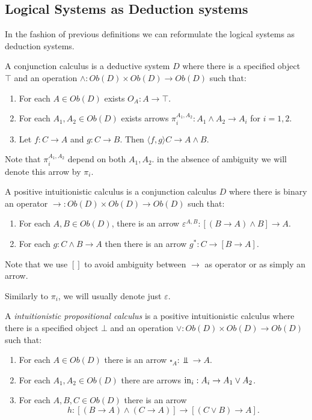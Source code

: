 \subsection{Logical Systems as Deduction systems}
In  the fashion of previous definitions we can reformulate the logical systems as deduction systems.
\begin{definition}
  A conjunction calculus is a deductive system $D$ where there is a specified object $\top$ and an operation $\land: Ob(D)\times Ob(D) \to Ob(D)$ such that:
  \begin{enumerate}
  \item For each $A\in Ob(D)$ exists $O_A:A\to \top$.
  \item For each $A_1,A_2\in Ob(D)$ exists arrows $\pi_i^{A_1,A_2}: A_1 \land A_2 \to A_i$ for $i=1,2$.
  \item Let $f:C\to A$ and $g:C\to B$. Then $\langle f,g\rangle C\to A\land B$.
  \end{enumerate}
\end{definition}

Note that $\pi_i^{A_1,A_2}$ depend on both $A_1,A_2$. in the absence of ambiguity we will denote this arrow by $\pi_i$.

\begin{definition} \label{def:positivecalculus}
  A positive intuitionistic calculus is a conjunction calculus $D$ where there is binary an operator $\to: Ob(D)\times Ob(D) \to Ob(D)$ such that:
  \begin{enumerate}
  \item For each $A,B \in Ob(D)$, there is an arrow $\varepsilon^{A,B}: [(B \to A) \land B]\to A$.
  \item For each $g:C\land B \to A$ then there is an arrow $g^*: C\to [B\to A]$.
  \end{enumerate}
\end{definition}
\begin{remark}
  Note that we use $[]$ to avoid ambiguity between $\to$ as operator or as simply an arrow.
\end{remark}
Similarly to $\pi_i$, we will usually denote just $\varepsilon$. 
\begin{definition}\label{def:intuipropcalculus}
  A \emph{intuitionistic propositional calculus} is a positive intuitionistic calculus where there is a specified object $\bot$ and an operation $\lor: Ob(D)\times Ob(D) \to Ob(D)$ such that:
  \begin{enumerate}
  \item For each $A\in Ob(D)$ there is an arrow $\square_A: \Bot\to A$.
  \item For each $A_1,A_2\in Ob(D)$ there are arrows $\operatorname{in}_i: A_i\to A_1 \lor A_2 $.
  \item For each $A,B,C \in Ob(D)$ there is an arrow $$h:[(B\to A)\land (C\to A)] \to [(C\lor B)\to A].$$
  \end{enumerate}
\end{definition}


